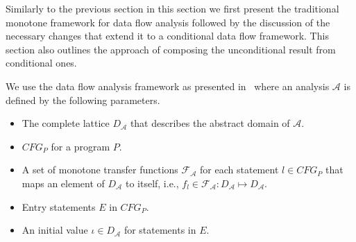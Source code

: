 
Similarly to the previous section in this section we first present the traditional monotone framework for data flow analysis followed by the discussion of the necessary changes that extend it to a conditional data flow framework. This section also outlines the approach of composing the unconditional result from conditional ones.

We use the data flow analysis framework as presented in~\cite{Nielson:1999} where an analysis $\mathcal{A}$ is defined by the following parameters. 
\begin{itemize}
\item The complete lattice $D_\mathcal{A}$ that describes the abstract domain of $\mathcal{A}$.
\item $CFG_P$ for a program $P$.
\item  A set of monotone transfer functions $\mathcal{F}_\mathcal{A}$ for each statement $l \in CFG_P$ that maps an element of $D_\mathcal{A}$ to itself, i.e., $f_l \in \mathcal{F}_\mathcal{A} : D_\mathcal{A} \mapsto D_\mathcal{A}$.
\item Entry statements $E$ in $CFG_P$.
\item An initial value $\iota\in D_\mathcal{A}$ for statements in $E$.
\end{itemize}

